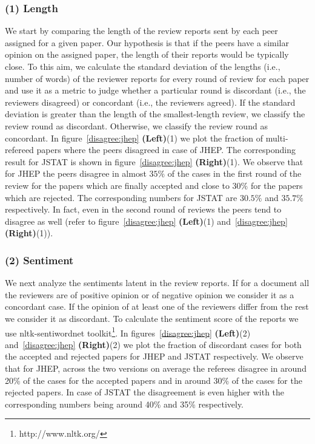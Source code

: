 \subsubsection*{(1) Length}

We start by comparing the length of the review reports sent by each peer assigned for a given paper. Our hypothesis is that if the peers have a similar 
opinion on the assigned paper, the length of their reports would be typically close. To this aim, we calculate the standard deviation of the lengths 
(i.e., number of words) of the reviewer reports for every round of review for each paper and use it as a metric to judge whether a particular round is discordant 
(i.e., the reviewers disagreed) or concordant (i.e., the reviewers agreed). If the standard deviation is greater than the length of the smallest-length review, 
we classify the review round as discordant. Otherwise, we classify the review round as concordant.
In figure~\ref{disagree:jhep} {\bf(Left)}(1) we plot the fraction of multi-refereed papers where the peers disagreed in case of JHEP. The corresponding result for 
JSTAT is shown in figure~\ref{disagree:jhep} {\bf(Right)}(1). We observe that for JHEP the peers disagree in almost $35\%$ of the cases in the first round of the review 
for the papers which are finally accepted and close to $30\%$ for the papers which are rejected. The corresponding numbers for JSTAT are $30.5\%$ and $35.7\%$ 
respectively. In fact, even in the second round of reviews the peers tend to disagree as well (refer to figure~\ref{disagree:jhep} {\bf(Left)}(1) 
and~\ref{disagree:jhep} {\bf(Right)}(1)).

\subsubsection*{(2) Sentiment}

We next analyze the sentiments latent in the review reports. If for a document all the reviewers are of positive opinion or of negative opinion we 
consider it as a concordant case. If the opinion of at least one of the reviewers differ from the rest we consider it as discordant. 
To calculate the sentiment score of the reports we use nltk-sentiwordnet toolkit\footnote{http://www.nltk.org/}. In figures~\ref{disagree:jhep} {\bf(Left)}(2) 
and~\ref{disagree:jhep} {\bf(Right)}(2) 
we plot the fraction of discordant cases for both the accepted and rejected papers for JHEP and JSTAT respectively. We observe that for JHEP, across the two versions on average 
the referees 
disagree in around 20\% of the cases for the accepted papers and in around 30\% of the cases for the rejected papers. In case of JSTAT the disagreement is even higher 
with the corresponding numbers being around 40\% and 35\% respectively. 


